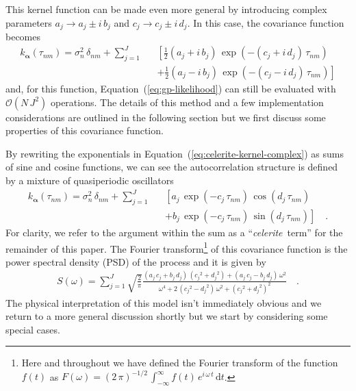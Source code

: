 \documentclass[manuscript, letterpaper]{aastex6}
\newcommand{\celeriteterm}{\emph{celerite}}
\renewcommand{\eqref}[1]{\ref{eq:#1}}
\newcommand{\Eq}[1]{Equation~(\eqref{#1})}
\newcommand{\eq}[1]{\Eq{#1}}
\newcommand{\eqlabel}[1]{\label{eq:#1}}
\newcommand{\dd}{\ensuremath{\,\mathrm{d}}}
\newcommand{\bvec}[1]{{\ensuremath{\boldsymbol{#1}}}}
\begin{document}
This kernel function can be made even more general by
introducing complex parameters $a_j \to a_j\pm i\,b_j$ and
$c_j \to c_j\pm i\,d_j$.
In this case, the covariance function becomes
\begin{eqnarray}\eqlabel{celerite-kernel-complex}
k_\bvec{\alpha}(\tau_{nm}) = \sigma_n^2\,\delta_{nm} +
    \sum_{j=1}^J &&\left[
    \frac{1}{2}(a_j + i\,b_j)\,\exp\left(-(c_j+i\,d_j)\,\tau_{nm}\right)
        \right. \nonumber\\
    &&+\left.
    \frac{1}{2}(a_j - i\,b_j)\,\exp\left(-(c_j-i\,d_j)\,\tau_{nm}\right)
\right]
\end{eqnarray}
and, for this function, \eq{gp-likelihood} can still be evaluated with
$\mathcal{O}(N\,J^2)$ operations.
The details of this method and a few implementation considerations are
outlined in the following section but we first discuss some
properties of this covariance function.

By rewriting the exponentials in \eq{celerite-kernel-complex} as sums of sine
and cosine functions, we can see the autocorrelation structure is defined by a
mixture of quasiperiodic oscillators
\begin{eqnarray}\eqlabel{celerite-kernel}
k_\bvec{\alpha}(\tau_{nm}) = \sigma_n^2\,\delta_{nm} +
    \sum_{j=1}^J &&\left[
    a_j\,\exp\left(-c_j\,\tau_{nm}\right)\,\cos\left(d_j\,\tau_{nm}\right)
        \right.\nonumber\\
    &&+ \left.
    b_j\,\exp\left(-c_j\,\tau_{nm}\right)\,\sin\left(d_j\,\tau_{nm}\right)
\right] \quad.
\end{eqnarray}
For clarity, we refer to the argument within the sum as a ``\celeriteterm\
term'' for the remainder of this paper.
The Fourier transform\footnote{Here and throughout we have defined the Fourier
transform of the function $f(t)$ as $F(\omega)={(2\,\pi)}^{-1/2}\,
\int_{-\infty}^\infty f(t)\,e^{i\,\omega\,t}\dd t$.} of this covariance
function is the power spectral density (PSD) of the process and it is given by
\begin{eqnarray}\eqlabel{celerite-psd}
S(\omega) = \sum_{j=1}^J \sqrt{\frac{2}{\pi}}
\frac{(a_j\,c_j+b_j\,d_j)\,({c_j}^2+{d_j}^2)+(a_j\,c_j-b_j\,d_j)\,\omega^2}
{\omega^4+2\,({c_j}^2-{d_j}^2)\,\omega^2+{({c_j}^2+{d_j}^2)}^2}\quad.
\end{eqnarray}
The physical interpretation of this model isn't immediately obvious and we
return to a more general discussion shortly but we start by considering some
special cases.
\end{document}

